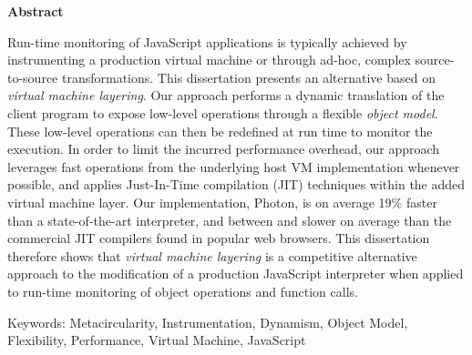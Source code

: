 \begin{center}
\textbf{\large Abstract}
\end{center}

\vspace{1cm}

Run-time monitoring of JavaScript applications is typically achieved by
instrumenting a production virtual machine or through ad-hoc, complex
source-to-source transformations. This dissertation presents an alternative
based on \emph{virtual machine layering}. Our approach performs a dynamic
translation of the client program to expose low-level operations through a
flexible \emph{object model}. These low-level operations can then be redefined
at run time to monitor the execution. In order to limit the incurred
performance overhead, our approach leverages fast operations from the
underlying host VM implementation whenever possible, and applies Just-In-Time
compilation (JIT) techniques within the added virtual machine layer. Our
implementation, Photon, is on average 19\% faster than a state-of-the-art
interpreter, and between  and  slower on average than the
commercial JIT compilers found in popular web browsers.  This dissertation
therefore shows that \emph{virtual machine layering} is a competitive
alternative approach to the modification of a production JavaScript interpreter
when applied to run-time monitoring of object operations and function calls.  
			

Keywords: Metacircularity, Instrumentation, Dynamism, Object Model,
Flexibility, Performance, Virtual Machine, JavaScript  
